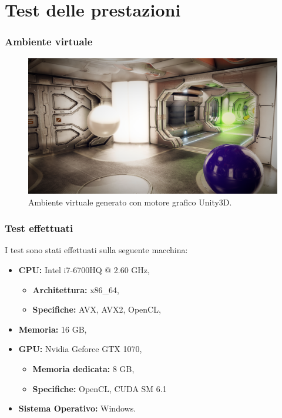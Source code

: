 \documentclass{beamer}
\begin{document}
\section{Test delle prestazioni}
\begin{frame}
\frametitle{Ambiente virtuale}
\begin{figure}[h!]
	\centering
	\includegraphics[width=320pt]{imgs/zona2.png}
	\caption{Ambiente virtuale generato con motore grafico Unity3D.}
	\label{vis:virtual}
\end{figure} 
\end{frame}

\begin{frame}
\frametitle{Test effettuati}
I test sono stati effettuati sulla seguente macchina:
\begin{itemize}
	\item \textbf{CPU:} Intel i7-6700HQ @ 2.60 GHz,
	\begin{itemize}
		\item \textbf{Architettura:} x86\_64, 
		\item \textbf{Specifiche:} AVX, AVX2, OpenCL,
	\end{itemize}		
	\item \textbf{Memoria:} 16 GB, 
	\item \textbf{GPU:} Nvidia Geforce GTX 1070,
	\begin{itemize}
		\item \textbf{Memoria dedicata:} 8 GB, 
		\item \textbf{Specifiche:} OpenCL, CUDA SM 6.1
	\end{itemize}			
	\item \textbf{Sistema Operativo:}  Windows.	 
\end{itemize}
\end{frame}
\end{document}
